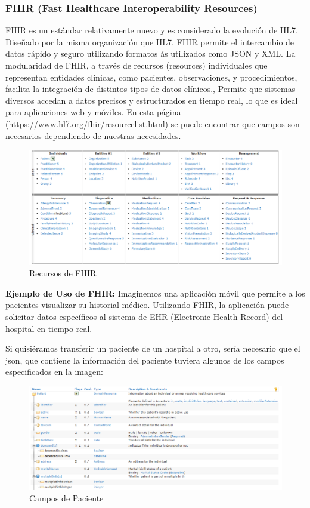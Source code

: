 \documentclass[12pt, a4paper, twoside]{article}
\begin{document}
	
	\subsubsection{FHIR (Fast Healthcare Interoperability Resources)} 
	
	FHIR es un estándar relativamente nuevo y es considerado la evolución de HL7. Diseñado por la misma organización que HL7, FHIR permite el intercambio de datos rápido y seguro utilizando formatos ás utilizados como JSON y XML. La modularidad de FHIR, a través de recursos (resources) individuales que representan entidades clínicas, como pacientes, observaciones, y procedimientos, facilita la integración de distintos tipos de datos clínicos., Permite que sistemas diversos accedan a datos precisos y estructurados en tiempo real, lo que es ideal para aplicaciones web y móviles.
	En esta página (https://www.hl7.org/fhir/resourcelist.html) se puede encontrar que campos son necesarios dependiendo de nuestras necesidades. 
	
	\begin{figure}[h!]
		\includegraphics[width=1\textwidth]{image/1.png}
		\caption{Recursos de FHIR}
		\label{fig:1}
	\end{figure}
	\vspace{9cm}
	
	\textbf{Ejemplo de Uso de FHIR:} Imaginemos una aplicación móvil que permite a los pacientes visualizar su historial médico. Utilizando FHIR, la aplicación puede solicitar datos específicos al sistema de EHR (Electronic Health Record) del hospital en tiempo real.
	
	Si quisiéramos transferir un paciente de un hospital a otro, sería necesario que el json, que contiene la información del paciente tuviera algunos de los campos especificados en la imagen:
	\vspace{1cm}
	
	\begin{figure}[h!]
		\includegraphics[width=1\textwidth]{image/2.png}
		\caption{Campos de Paciente}
		\label{fig:2}
	\end{figure}
	
\end{document}
